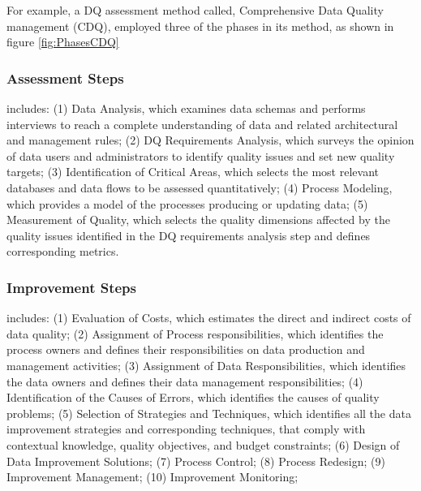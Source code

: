 \documentclass[pdftex,english,oribibl]{llncs}
\begin{document}
For example, a DQ assessment method called, Comprehensive Data Quality management (CDQ),  employed three of the phases in its method, as shown in figure \ref{fig:PhasesCDQ}

\begin{comment}
The term assessment is used when such measurements are compared to reference values, in order to enable a diagnosis of quality. The term assessment is adopted in this article, consistent with the majority of methodologies, which stress the importance of the causes of poor data quality.
\end{comment}

\subsubsection{Assessment Steps}
includes:
(1) Data Analysis, which examines data schemas and performs interviews to reach a complete understanding of data and related architectural and management rules;
(2) DQ Requirements Analysis, which surveys the opinion of data users and administrators to identify quality issues and set new quality targets;
(3) Identification of Critical Areas, which selects the most relevant databases and data flows to be assessed quantitatively;
(4) Process Modeling, which provides a model of the processes producing or updating data;
(5) Measurement of Quality, which selects the quality dimensions affected by the quality issues identified in the DQ requirements analysis step and defines corresponding metrics.
\begin{comment}
measurement can be objective when it is based on quantitative metrics, or subjective, when it is based on qualitative evaluations by data administrators and users.
\end{comment}

\subsubsection{Improvement Steps}
includes:
(1) Evaluation of Costs, which estimates the direct and indirect costs of data quality;
(2) Assignment of Process responsibilities, which identifies the process owners and defines their responsibilities on data production and management activities;
(3) Assignment of Data Responsibilities, which identifies the data owners and defines their data management responsibilities;
(4) Identification of the Causes of Errors, which identifies the causes of quality problems;
(5) Selection of Strategies and Techniques, which identifies all the data improvement strategies and corresponding techniques, that comply with contextual knowledge, quality objectives, and budget constraints;
(6) Design of Data Improvement Solutions;
(7) Process Control;
(8) Process Redesign;
(9) Improvement Management;
(10) Improvement Monitoring;
\end{document}
